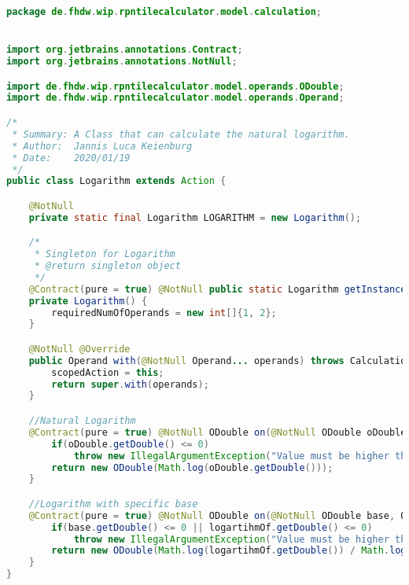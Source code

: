\begin{lstlisting}[caption=Logarithm (Keienburg),label=list:Logarithm,language=Java]
package de.fhdw.wip.rpntilecalculator.model.calculation;


import org.jetbrains.annotations.Contract;
import org.jetbrains.annotations.NotNull;

import de.fhdw.wip.rpntilecalculator.model.operands.ODouble;
import de.fhdw.wip.rpntilecalculator.model.operands.Operand;

/*
 * Summary: A Class that can calculate the natural logarithm.
 * Author:  Jannis Luca Keienburg
 * Date:    2020/01/19
 */
public class Logarithm extends Action {

    @NotNull
    private static final Logarithm LOGARITHM = new Logarithm();

    /*
     * Singleton for Logarithm
     * @return singleton object
     */
    @Contract(pure = true) @NotNull public static Logarithm getInstance() { return LOGARITHM; }
    private Logarithm() {
        requiredNumOfOperands = new int[]{1, 2};
    }

    @NotNull @Override
    public Operand with(@NotNull Operand... operands) throws CalculationException {
        scopedAction = this;
        return super.with(operands);
    }

    //Natural Logarithm
    @Contract(pure = true) @NotNull ODouble on(@NotNull ODouble oDouble) {
        if(oDouble.getDouble() <= 0)
            throw new IllegalArgumentException("Value must be higher than Zero.");
        return new ODouble(Math.log(oDouble.getDouble()));
    }

    //Logarithm with specific base
    @Contract(pure = true) @NotNull ODouble on(@NotNull ODouble base, ODouble logartihmOf) {
        if(base.getDouble() <= 0 || logartihmOf.getDouble() <= 0)
            throw new IllegalArgumentException("Value must be higher than Zero.");
        return new ODouble(Math.log(logartihmOf.getDouble()) / Math.log(base.getDouble()));
    }
}

\end{lstlisting}    

